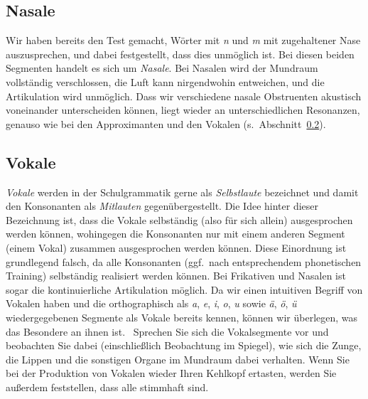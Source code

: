 \subsection{Nasale}

\label{sec:nasale}

Wir haben bereits den Test gemacht, Wörter mit \textit{n} und \textit{m} mit zugehaltener Nase auszusprechen, und dabei festgestellt, dass dies unmöglich ist.
Bei diesen beiden Segmenten handelt es sich um \textit{Nasale}.
Bei Nasalen wird der Mundraum vollständig verschlossen, die Luft kann nirgendwohin entweichen, und die Artikulation wird unmöglich.
Dass wir verschiedene nasale Obstruenten akustisch voneinander unterscheiden können, liegt wieder an unterschiedlichen Resonanzen, genauso wie bei den Approximanten und den Vokalen (s.\ Abschnitt~\ref{sec:vokale}).


\subsection{Vokale}

\label{sec:vokale}

\textit{Vokale} werden in der Schulgrammatik gerne als \textit{Selbstlaute} bezeichnet und damit den Konsonanten als \textit{Mitlauten} gegenübergestellt.
Die Idee hinter dieser Bezeichnung ist, dass die Vokale selbständig (also für sich allein) ausgesprochen werden können, wohingegen die Konsonanten nur mit einem anderen Segment (einem Vokal) zusammen ausgesprochen werden können.
Diese Einordnung ist grundlegend falsch, da alle Konsonanten (ggf.\ nach entsprechendem phonetischen Training) selbständig realisiert werden können.
Bei Frikativen und Nasalen ist sogar die kontinuierliche Artikulation möglich.
Da wir einen intuitiven Begriff von Vokalen haben und die orthographisch als \textit{a}, \textit{e}, \textit{i}, \textit{o}, \textit{u} sowie \textit{ä}, \textit{ö}, \textit{ü} wiedergegebenen Segmente als Vokale bereits kennen, können wir überlegen, was das Besondere an ihnen ist.
\TuBegin~Sprechen Sie sich die Vokalsegmente vor und beobachten Sie dabei (einschließlich Beobachtung im Spiegel), wie sich die Zunge, die Lippen und die sonstigen Organe im Mundraum dabei verhalten. Wenn Sie bei der Produktion von Vokalen wieder Ihren Kehlkopf ertasten, werden Sie außerdem feststellen, dass alle stimmhaft sind.

